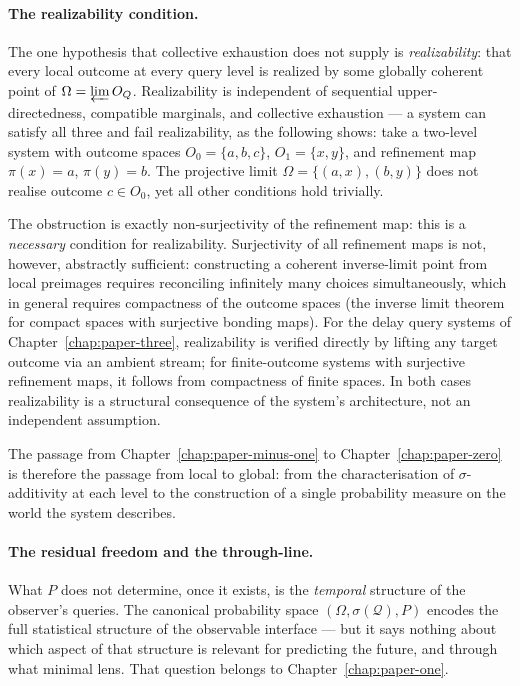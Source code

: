 \paragraph{The realizability condition.}
The one hypothesis that collective exhaustion does not supply is
\emph{realizability}: that every local outcome at every query level is realized by
some globally coherent point of $\Omega = \varprojlim O_Q$.  Realizability is
independent of sequential upper-directedness, compatible marginals, and collective
exhaustion --- a system can satisfy all three and fail realizability, as the following
shows: take a two-level system with outcome spaces $O_0 = \{a,b,c\}$,
$O_1 = \{x,y\}$, and refinement map $\pi(x)=a$, $\pi(y)=b$.  The projective limit
$\Omega = \{(a,x),(b,y)\}$ does not realise outcome $c\in O_0$, yet all other
conditions hold trivially.

The obstruction is exactly non-surjectivity of the refinement map: this is a
\emph{necessary} condition for realizability.  Surjectivity of all refinement maps
is not, however, abstractly sufficient: constructing a coherent inverse-limit point
from local preimages requires reconciling infinitely many choices simultaneously,
which in general requires compactness of the outcome spaces (the inverse limit theorem
for compact spaces with surjective bonding maps).  For the delay query systems of
Chapter~\ref{chap:paper-three}, realizability is verified directly by lifting any
target outcome via an ambient stream; for finite-outcome systems with surjective
refinement maps, it follows from compactness of finite spaces.  In both cases
realizability is a structural consequence of the system's architecture, not an
independent assumption.

The passage from Chapter~\ref{chap:paper-minus-one} to Chapter~\ref{chap:paper-zero}
is therefore the passage from local to global: from the characterisation of
$\sigma$-additivity at each level to the construction of a single probability measure
on the world the system describes.

\paragraph{The residual freedom and the through-line.}
What $P$ does not determine, once it exists, is the \emph{temporal} structure of the
observer's queries.  The canonical probability space $(\Omega, \sigma(\mathcal{Q}), P)$
encodes the full statistical structure of the observable interface --- but it says nothing
about which aspect of that structure is relevant for predicting the future, and through
what minimal lens.  That question belongs to Chapter~\ref{chap:paper-one}.


